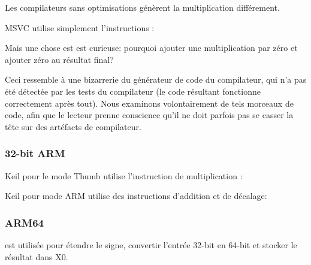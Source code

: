 Les compilateurs sans optimisations génèrent la multiplication différement.



MSVC \NonOptimizing utilise simplement l'instructions \IMUL:



\myindex{\CompilerAnomaly}
\label{MSVC2013_anomaly}

Mais une chose est est curieuse: pourquoi ajouter une multiplication par zéro et
ajouter zéro au résultat final?

Ceci ressemble à une bizarrerie du générateur de code du compilateur, qui n'a pas
été détectée par les tests du compilateur (le code résultant fonctionne correctement
après tout).
%
Nous examinons volontairement de tels morceaux de code, afin que le lecteur prenne
conscience qu'il ne doit parfois pas se casser la tête sur des artéfacts de compilateur.

\subsubsection{32-bit ARM}

Keil \Optimizing pour le mode Thumb utilise l'instruction de multiplication :



Keil \Optimizing pour mode ARM utilise des instructions d'addition et de décalage:



\subsubsection{ARM64}




 est utilisée pour étendre le signe, convertir l'entrée 32-bit en 64-bit
et stocker le résultat dans X0.

